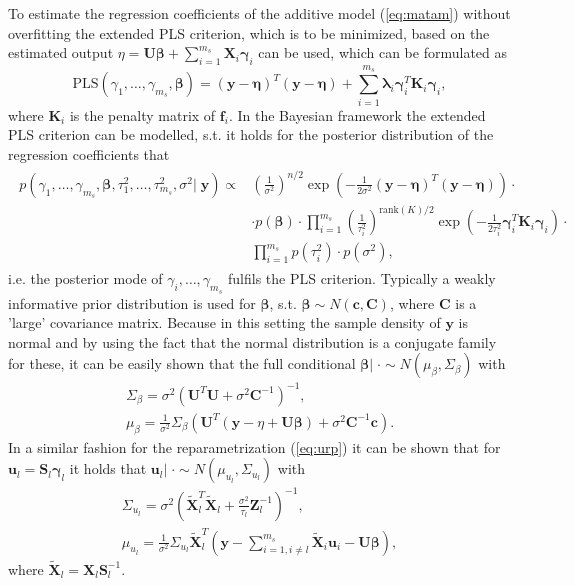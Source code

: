 \documentclass[12pt,letterpaper]{article}
\numberwithin{equation}{subsection}
\begin{document}
To estimate the regression coefficients of the additive model (\ref{eq:matam}) without overfitting the extended PLS criterion, which is to be minimized, based on the estimated output $\eta = \mathbf{U}\mathbf{\beta} +  \sum^{m_s}_{i=1} \mathbf{X}_i\mathbf{\gamma}_i$
can be used, which can be formulated as
\begin{equation}
\text{PLS}(\gamma_1,\dots ,\gamma_{m_s},\mathbf{\beta}) = (\mathbf{y} - \mathbf{\eta})^T(\mathbf{y} - \mathbf{\eta}) + \sum^{m_s}_{i=1} \mathbf{\lambda}_i\mathbf{\gamma}_i^T\mathbf{K}_i\mathbf{\gamma}_i,
\end{equation}
where $\mathbf{K}_i$ is the penalty matrix of $\mathbf{f}_i$. In the Bayesian framework the extended PLS criterion can be modelled, s.t. it holds for the posterior distribution of the regression coefficients that 
\begin{align}
\begin{split}
p(\gamma_1,\dots ,\gamma_{m_s},\mathbf{\beta},\tau^2_1,\dots,\tau^2_{m_s},\sigma^2| \; \mathbf{y}) \propto &
(\frac{1}{\sigma^2})^{n/2}\exp(-\frac{1}{2\sigma^2}(\mathbf{y} - \mathbf{\eta})^T(\mathbf{y} - \mathbf{\eta})) \cdot \\
& \cdot p(\mathbf{\beta}) \cdot \prod^{m_s}_{i=1}(\frac{1}{\tau^2_i})^{\text{rank}(K)/2}\exp(-\frac{1}{2\tau_i^2}\mathbf{\gamma}_i^T\mathbf{K}_i\mathbf{\gamma}_i) \cdot \\
& \prod^{m_s}_{i=1}  p(\tau^2_i)  \cdot  p(\sigma^2),
\end{split}
\end{align}
i.e. the posterior mode of $\gamma_i ,\dots,\gamma_{m_s}$ fulfils the PLS criterion. Typically a weakly informative prior distribution is used for $\mathbf{\beta}$, s.t. $\mathbf{\beta} \sim N(\mathbf{c},\mathbf{C})$, where $\mathbf{C}$ is a 'large' covariance matrix. Because in this setting the sample density of $\mathbf{y}$ is normal and by using the fact that the normal distribution is a conjugate family for these, it can be easily shown that the full conditional $\mathbf{\beta} |\; \cdot \sim N(\mu_\beta, \Sigma_\beta)$ with
\begin{align}
\Sigma_\beta = \sigma^2(\mathbf{U}^T\mathbf{U} + \sigma^2 \mathbf{C}^{-1})^{-1}, \\
\mu_\beta = \frac{1}{\sigma^2}\Sigma_\beta(\mathbf{U}^T(\mathbf{y} - \eta + \mathbf{U}\mathbf{\beta}) + \sigma^2\mathbf{C}^{-1}\mathbf{c}).
\label{eq:mubeta}
\end{align}
In a similar fashion for the reparametrization (\ref{eq:urp}) it can be shown that for $\mathbf{u}_l = \mathbf{S}_l\mathbf{\gamma}_l$ it holds that $\mathbf{u}_l |\; \cdot \sim N(\mu_{u_l}, \Sigma_{u_l})$ with
\begin{align}
\Sigma_{u_l} = \sigma^2(\tilde{\mathbf{X}}_l^T\tilde{\mathbf{X}}_l + \frac{\sigma^2}{\tau_l} \mathbf{Z}_l^{-1})^{-1}, \\
\mu_{u_l} = \frac{1}{\sigma^2}\Sigma_{u_l}\tilde{\mathbf{X}}_l^T(\mathbf{y} - \sum^{m_s}_{i=1,i\neq l} \tilde{\mathbf{X}}_i\mathbf{u}_i - \mathbf{U}\mathbf{\beta}),
\label{eq:muU}
\end{align}
where $\tilde{\mathbf{X}}_l = \mathbf{X}_l\mathbf{S}^{-1}_l$.
\label{sec:AddMod}
\pagebreak
\end{document}
